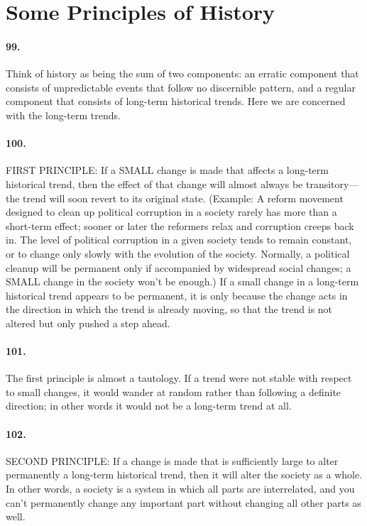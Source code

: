 \documentclass[12pt]{book}
\newcommand{\mysection}[1]{\section*{#1} \addcontentsline{toc}{section}{#1}}
\begin{document}
\mysection{Some Principles of History}


\paragraph{99.} Think of history as being the sum of two components: an erratic component that consists of unpredictable events that follow no discernible pattern, and a regular component that consists of long-term historical trends.  Here we are concerned with the long-term trends.


\paragraph{100.}  FIRST PRINCIPLE: If a SMALL change is made that affects a long-term historical trend, then the effect of that change will almost always be transitory---the trend will soon revert to its original state. (Example: A reform movement designed to clean up political corruption in a society rarely has more than a short-term effect; sooner or later the reformers relax and corruption creeps back in. The level of political corruption in a given society tends to remain constant, or to change only slowly with the evolution of the society. Normally, a political cleanup will be permanent only if accompanied by widespread social changes; a SMALL change in the society won't be enough.) If a small change in a long-term historical trend appears to be permanent, it is only because the change acts in the direction in which the trend is already moving, so that the trend is not altered but only pushed a step ahead.


\paragraph{101.}  The first principle is almost a tautology. If a trend were not stable with respect to small changes, it would wander at random rather than following a definite direction; in other words it would not be a long-term trend at all.


\paragraph{102.}  SECOND PRINCIPLE: If a change is made that is sufficiently large to alter permanently a long-term historical trend, then it will alter the society as a whole. In other words, a society is a system in which all parts are interrelated, and you can't permanently change any important part without changing all other parts as well.
\end{document}
